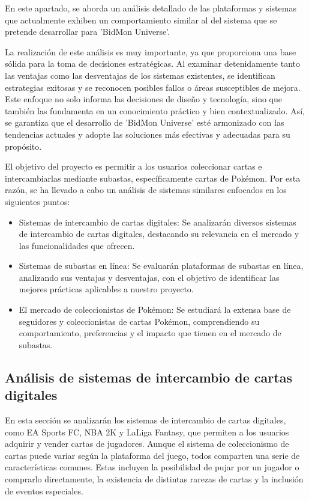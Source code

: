 
En este apartado, se aborda un análisis detallado de las plataformas y sistemas que actualmente exhiben un comportamiento similar al del sistema que se pretende desarrollar para 'BidMon Universe'. 

La realización de este análisis es muy importante, ya que proporciona una base sólida para la toma de decisiones estratégicas. Al examinar detenidamente tanto las ventajas como las desventajas de los sistemas existentes, se identifican estrategias exitosas y se reconocen posibles fallos 
o áreas susceptibles de mejora. Este enfoque no solo informa las decisiones de diseño y tecnología, sino que también las fundamenta en un conocimiento práctico y bien contextualizado. Así, se garantiza que el desarrollo de 'BidMon Universe' esté 
armonizado con las tendencias actuales y adopte las soluciones más efectivas y adecuadas para su propósito.

El objetivo del proyecto es permitir a los usuarios coleccionar cartas e intercambiarlas mediante subastas, específicamente cartas de Pokémon. Por esta razón, se ha llevado a cabo un análisis de sistemas similares enfocados en los siguientes puntos:
\begin{itemize}
    \item Sistemas de intercambio de cartas digitales: Se analizarán diversos sistemas de intercambio de cartas digitales, destacando su relevancia en el mercado y las funcionalidades que ofrecen.
    \item Sistemas de subastas en línea: Se evaluarán plataformas de subastas en línea, analizando sus ventajas y desventajas, con el objetivo de identificar las mejores prácticas aplicables a nuestro proyecto.
    \item El mercado de coleccionistas de Pokémon: Se estudiará la extensa base de seguidores y coleccionistas de cartas Pokémon, comprendiendo su comportamiento, preferencias y el impacto que tienen en el mercado de subastas.
\end{itemize}

\subsection{Análisis de sistemas de intercambio de cartas digitales}
En esta sección se analizarán los sistemas de intercambio de cartas digitales, como EA Sports FC, NBA 2K y LaLiga Fantasy, que permiten a los usuarios adquirir y vender cartas de jugadores. 
Aunque el sistema de coleccionismo de cartas puede variar según la plataforma del juego, todos comparten una serie de características comunes. Estas incluyen la posibilidad de pujar 
por un jugador o comprarlo directamente, la existencia de distintas rarezas de cartas y la inclusión de eventos especiales.

